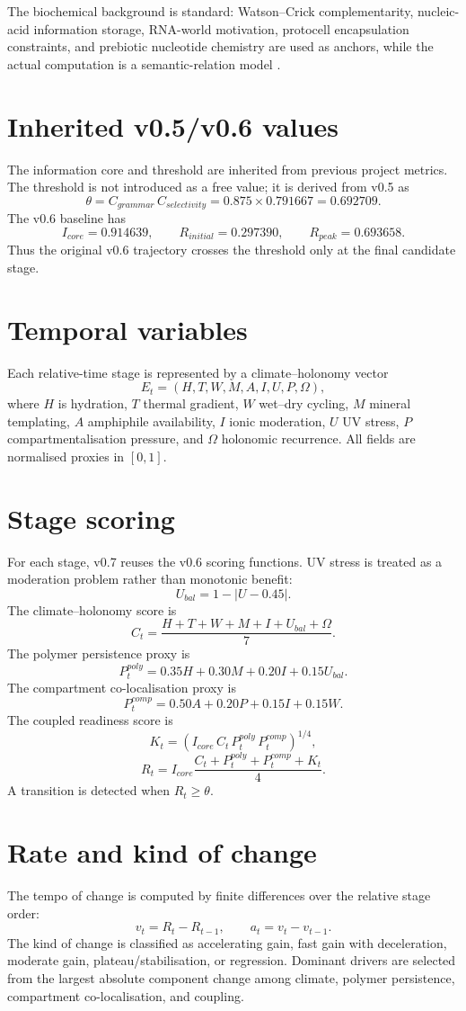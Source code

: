\documentclass[11pt]{article}
\begin{document}
The biochemical background is standard: Watson--Crick complementarity, nucleic-acid information storage, RNA-world motivation, protocell encapsulation constraints, and prebiotic nucleotide chemistry are used as anchors, while the actual computation is a semantic-relation model \cite{WatsonCrick1953,RobertsonJoyce2012,PownerGerlandSutherland2009,JoyceSzostak2018,AdamalaSzostak2013}.

\section{Inherited v0.5/v0.6 values}
The information core and threshold are inherited from previous project metrics.  The threshold is not introduced as a free value; it is derived from v0.5 as
\[
\theta = C_{grammar}\,C_{selectivity}=0.875\times 0.791667 = 0.692709.
\]
The v0.6 baseline has
\[
I_{core}=0.914639,\qquad R_{initial}=0.297390,\qquad R_{peak}=0.693658.
\]
Thus the original v0.6 trajectory crosses the threshold only at the final candidate stage.

\section{Temporal variables}
Each relative-time stage is represented by a climate--holonomy vector
\[
E_t=(H,T,W,M,A,I,U,P,\Omega),
\]
where $H$ is hydration, $T$ thermal gradient, $W$ wet--dry cycling, $M$ mineral templating, $A$ amphiphile availability, $I$ ionic moderation, $U$ UV stress, $P$ compartmentalisation pressure, and $\Omega$ holonomic recurrence.  All fields are normalised proxies in $[0,1]$.

\section{Stage scoring}
For each stage, v0.7 reuses the v0.6 scoring functions.  UV stress is treated as a moderation problem rather than monotonic benefit:
\[
U_{bal}=1-|U-0.45|.
\]
The climate--holonomy score is
\[
C_t=\frac{H+T+W+M+I+U_{bal}+\Omega}{7}.
\]
The polymer persistence proxy is
\[
P_t^{poly}=0.35H+0.30M+0.20I+0.15U_{bal}.
\]
The compartment co-localisation proxy is
\[
P_t^{comp}=0.50A+0.20P+0.15I+0.15W.
\]
The coupled readiness score is
\[
K_t=(I_{core}\,C_t\,P_t^{poly}\,P_t^{comp})^{1/4},
\]
\[
R_t=I_{core}\frac{C_t+P_t^{poly}+P_t^{comp}+K_t}{4}.
\]
A transition is detected when $R_t\geq \theta$.

\section{Rate and kind of change}
The tempo of change is computed by finite differences over the relative stage order:
\[
v_t=R_t-R_{t-1},\qquad a_t=v_t-v_{t-1}.
\]
The kind of change is classified as accelerating gain, fast gain with deceleration, moderate gain, plateau/stabilisation, or regression.  Dominant drivers are selected from the largest absolute component change among climate, polymer persistence, compartment co-localisation, and coupling.
\end{document}
